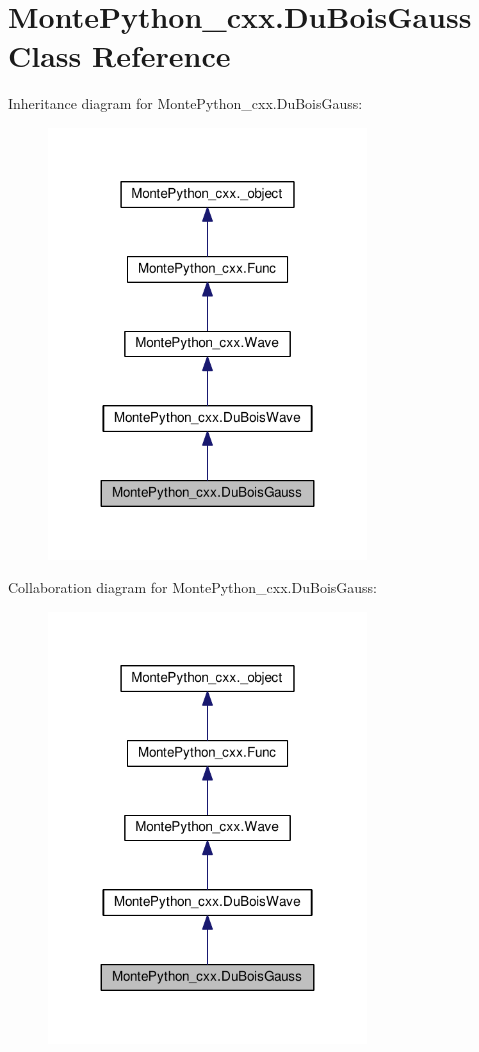 \hypertarget{classMontePython__cxx_1_1DuBoisGauss}{}\section{Monte\+Python\+\_\+cxx.\+Du\+Bois\+Gauss Class Reference}
\label{classMontePython__cxx_1_1DuBoisGauss}


Inheritance diagram for Monte\+Python\+\_\+cxx.\+Du\+Bois\+Gauss\+:
\nopagebreak
\begin{figure}[H]
\begin{center}
\leavevmode
\includegraphics[width=239pt]{classMontePython__cxx_1_1DuBoisGauss__inherit__graph}
\end{center}
\end{figure}


Collaboration diagram for Monte\+Python\+\_\+cxx.\+Du\+Bois\+Gauss\+:
\nopagebreak
\begin{figure}[H]
\begin{center}
\leavevmode
\includegraphics[width=239pt]{classMontePython__cxx_1_1DuBoisGauss__coll__graph}
\end{center}
\end{figure}

